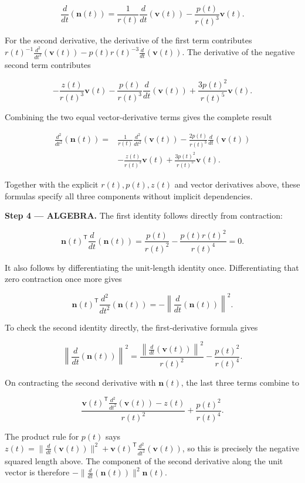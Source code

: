\documentclass[11pt,oneside,openany]{book}
\begin{document}
\[
\frac{d}{dt}\left(\mathbf n(t)\right)
=\frac{1}{r(t)}\frac{d}{dt}\left(\mathbf v(t)\right)
-\frac{p(t)}{r(t)^3}\mathbf v(t).
\]

For the second derivative, the derivative of the first term contributes
\(r(t)^{-1}\frac{d^2}{dt^2}(\mathbf v(t))-p(t)r(t)^{-3}\frac{d}{dt}(\mathbf v(t))\).
The derivative of the negative second term contributes

\[
-\frac{z(t)}{r(t)^3}\mathbf v(t)
-\frac{p(t)}{r(t)^3}\frac{d}{dt}\left(\mathbf v(t)\right)
+\frac{3p(t)^2}{r(t)^5}\mathbf v(t).
\]

Combining the two equal vector-derivative terms gives the complete result

\[
\begin{aligned}
\frac{d^2}{dt^2}\left(\mathbf n(t)\right)
={}&\frac{1}{r(t)}\frac{d^2}{dt^2}\left(\mathbf v(t)\right)
-\frac{2p(t)}{r(t)^3}\frac{d}{dt}\left(\mathbf v(t)\right)\\
&-\frac{z(t)}{r(t)^3}\mathbf v(t)
+\frac{3p(t)^2}{r(t)^5}\mathbf v(t).
\end{aligned}
\]

Together with the explicit \(r(t),p(t),z(t)\) and vector derivatives above, these formulas specify all three components without implicit dependencies.

\begingroup\color{AlgebraBlue}
\textbf{Step 4 --- ALGEBRA.} The first identity follows directly from contraction:

\[
\mathbf n(t)^{\mathsf T}\frac{d}{dt}\left(\mathbf n(t)\right)
=\frac{p(t)}{r(t)^2}-\frac{p(t)r(t)^2}{r(t)^4}=0.
\]

It also follows by differentiating the unit-length identity once. Differentiating that zero contraction once more gives

\[
\mathbf n(t)^{\mathsf T}\frac{d^2}{dt^2}\left(\mathbf n(t)\right)
=-\left\|\frac{d}{dt}\left(\mathbf n(t)\right)\right\|^2.
\]

To check the second identity directly, the first-derivative formula gives

\[
\left\|\frac{d}{dt}\left(\mathbf n(t)\right)\right\|^2
=\frac{\left\|\frac{d}{dt}(\mathbf v(t))\right\|^2}{r(t)^2}
-\frac{p(t)^2}{r(t)^4}.
\]

On contracting the second derivative with \(\mathbf n(t)\), the last three terms combine to

\[
\frac{\mathbf v(t)^{\mathsf T}\frac{d^2}{dt^2}(\mathbf v(t))-z(t)}{r(t)^2}
+\frac{p(t)^2}{r(t)^4}.
\]

The product rule for \(p(t)\) says
\(z(t)=\|\frac{d}{dt}(\mathbf v(t))\|^2+\mathbf v(t)^{\mathsf T}\frac{d^2}{dt^2}(\mathbf v(t))\),
so this is precisely the negative squared length above. The component of the second derivative along the unit vector is therefore
\(-\|\frac{d}{dt}(\mathbf n(t))\|^2\mathbf n(t)\).
\end{document}
